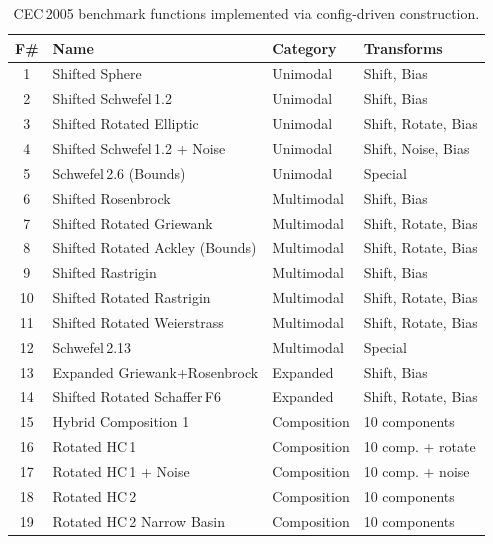 \documentclass[11pt,a4paper]{article}
\begin{document}
\begin{table}[t]
\centering
\caption{CEC\,2005 benchmark functions implemented via config-driven construction.}
\label{tab:cec2005}
\small
\begin{tabular}{@{}clll@{}}
\toprule
\textbf{F\#} & \textbf{Name} & \textbf{Category} & \textbf{Transforms} \\
\midrule
1  & Shifted Sphere                        & Unimodal      & Shift, Bias \\
2  & Shifted Schwefel\,1.2                 & Unimodal      & Shift, Bias \\
3  & Shifted Rotated Elliptic              & Unimodal      & Shift, Rotate, Bias \\
4  & Shifted Schwefel\,1.2 + Noise         & Unimodal      & Shift, Noise, Bias \\
5  & Schwefel\,2.6 (Bounds)                & Unimodal      & Special \\
6  & Shifted Rosenbrock                    & Multimodal    & Shift, Bias \\
7  & Shifted Rotated Griewank              & Multimodal    & Shift, Rotate, Bias \\
8  & Shifted Rotated Ackley (Bounds)       & Multimodal    & Shift, Rotate, Bias \\
9  & Shifted Rastrigin                     & Multimodal    & Shift, Bias \\
10 & Shifted Rotated Rastrigin             & Multimodal    & Shift, Rotate, Bias \\
11 & Shifted Rotated Weierstrass           & Multimodal    & Shift, Rotate, Bias \\
12 & Schwefel\,2.13                        & Multimodal    & Special \\
13 & Expanded Griewank+Rosenbrock          & Expanded      & Shift, Bias \\
14 & Shifted Rotated Schaffer\,F6          & Expanded      & Shift, Rotate, Bias \\
15 & Hybrid Composition 1                  & Composition   & 10 components \\
16 & Rotated HC\,1                         & Composition   & 10 comp. + rotate \\
17 & Rotated HC\,1 + Noise                 & Composition   & 10 comp. + noise \\
18 & Rotated HC\,2                         & Composition   & 10 components \\
19 & Rotated HC\,2 Narrow Basin            & Composition   & 10 components \\

\end{tabular}
\end{table}
\end{document}
